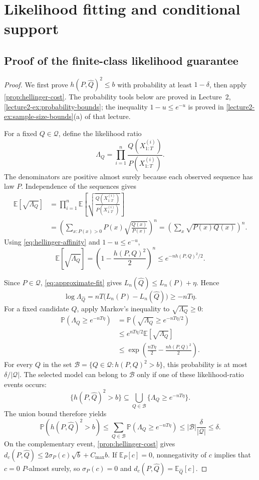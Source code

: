 \documentclass[11pt,twoside]{article}
\newcommand{\E}{\mathbb E}
\renewcommand{\P}{\mathbb P}
\theoremstyle{definition}
\theoremstyle{remark}
\begin{document}
\section{Likelihood fitting and conditional support}
\label{app:learning}

\subsection{Proof of the finite-class likelihood guarantee}
\label{app:finite-mle}

\finitemle*
\begin{proof}
We first prove \(h(P,\widehat Q)^2\le b\) with probability at least
\(1-\delta\), then apply \cref{prop:hellinger-cost}.
The probability tools below are proved in Lecture~2,
\cref{lecture2-ex:probability-bounds}; the inequality
\(1-u\le e^{-u}\) is proved in
\cref{lecture2-ex:sample-size-bounds}(a) of that lecture.

For a fixed \(Q\in\mathcal Q\), define the likelihood ratio
\[
 \Lambda_Q=\prod_{i=1}^n
 \frac{Q(X^{(i)}_{1:T})}{P(X^{(i)}_{1:T})}.
\]
The denominators are positive almost surely because each observed
sequence has law \(P\). Independence of the sequences gives
\begin{align*}
 \E[\sqrt{\Lambda_Q}]
 &=\prod_{i=1}^n\E\left[
       \sqrt{\frac{Q(X^{(i)}_{1:T})}{P(X^{(i)}_{1:T})}}\right]\\
 &=\left(\sum_{x:P(x)>0}P(x)\sqrt{\frac{Q(x)}{P(x)}}\right)^n
 =\left(\sum_x\sqrt{P(x)Q(x)}\right)^n.
\end{align*}
Using \cref{eq:hellinger-affinity} and \(1-u\le e^{-u}\),
\[
 \E[\sqrt{\Lambda_Q}]
 =\left(1-\frac{h(P,Q)^2}{2}\right)^n
 \le e^{-nh(P,Q)^2/2}.
\]

Since \(P\in\mathcal Q\), \cref{eq:approximate-fit} gives
\(L_n(\widehat Q)\le L_n(P)+\eta\). Hence
\[
 \log\Lambda_{\widehat Q}
 =nT\bigl(L_n(P)-L_n(\widehat Q)\bigr)
 \ge-nT\eta.
\]
For a fixed candidate \(Q\), apply Markov's inequality to
\(\sqrt{\Lambda_Q}\ge0\):
\begin{align*}
 \P(\Lambda_Q\ge e^{-nT\eta})
 &=\P(\sqrt{\Lambda_Q}\ge e^{-nT\eta/2})\\
 &\le e^{nT\eta/2}\E[\sqrt{\Lambda_Q}]\\
 &\le\exp\left(\frac{nT\eta}{2}-\frac{nh(P,Q)^2}{2}\right).
\end{align*}
For every \(Q\) in the set
\(\mathcal B=\{Q\in\mathcal Q:h(P,Q)^2>b\}\), this probability is
at most \(\delta/|\mathcal Q|\). The selected model can belong to
\(\mathcal B\) only if one of these likelihood-ratio events occurs:
\[
 \{h(P,\widehat Q)^2>b\}
 \subseteq\bigcup_{Q\in\mathcal B}
          \{\Lambda_Q\ge e^{-nT\eta}\}.
\]
The union bound therefore yields
\[
 \P(h(P,\widehat Q)^2>b)
 \le\sum_{Q\in\mathcal B}\P(\Lambda_Q\ge e^{-nT\eta})
 \le |\mathcal B|\frac{\delta}{|\mathcal Q|}\le\delta.
\]
On the complementary event, \cref{prop:hellinger-cost} gives
\(d_c(P,\widehat Q)\le2\sigma_P(c)\sqrt b+C_{\max}b\).
If \(\E_P[c]=0\), nonnegativity of \(c\) implies that \(c=0\)
\(P\)-almost surely, so \(\sigma_P(c)=0\) and
\(d_c(P,\widehat Q)=\E_{\widehat Q}[c]\).
\end{proof}
\end{document}
